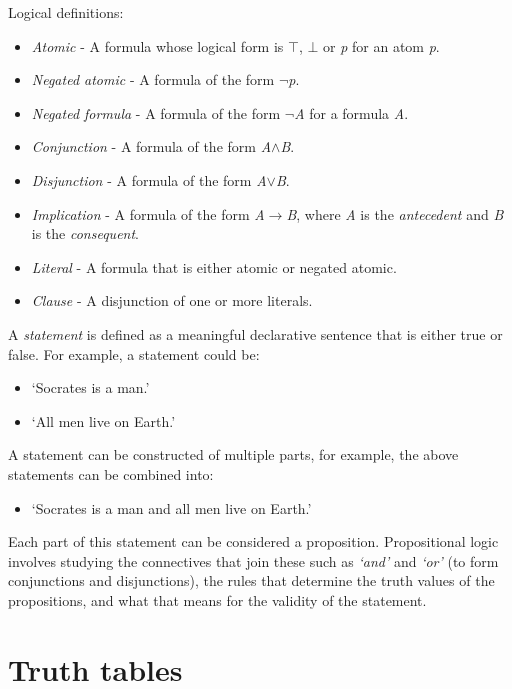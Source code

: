 \documentclass{report}
\begin{document}
Logical definitions:

\begin{itemize}
\item \emph{Atomic} - A formula whose logical form is $\top$, $\bot$ or \textit{p} for an atom \textit{p}.
\item \emph{Negated atomic} - A formula of the form $\neg$\textit{p}.
\item \emph{Negated formula} - A formula of the form $\neg$\textit{A} for a formula \textit{A}.
\item \emph{Conjunction} - A formula of the form \textit{A}$\land$\textit{B}.
\item \emph{Disjunction} - A formula of the form \textit{A}$\lor$\textit{B}.
\item \emph{Implication} - A formula of the form \textit{A}$\to$\textit{B}, where \textit{A} is the \emph{antecedent} and \textit{B} is the \emph{consequent}.
\item \emph{Literal} - A formula that is either atomic or negated atomic.
\item \emph{Clause} - A disjunction of one or more literals.
\end{itemize}

A \textit{statement} is defined as a meaningful declarative sentence that is either true or false. For example, a statement could be: 

\begin{itemize}
\item `Socrates is a man.'
\item `All men live on Earth.'
\end{itemize}
A statement can be constructed of multiple parts, for example, the above statements can be combined into:

\begin{itemize}
\item `Socrates is a man and all men live on Earth.'
\end{itemize}
Each part of this statement can be considered a proposition. Propositional logic involves studying the connectives that join these such as \textit{`and'} and \textit{`or'} (to form conjunctions and disjunctions), the rules that determine the truth values of the propositions, and what that means for the validity of the statement.

\section{Truth tables}
\end{document}
